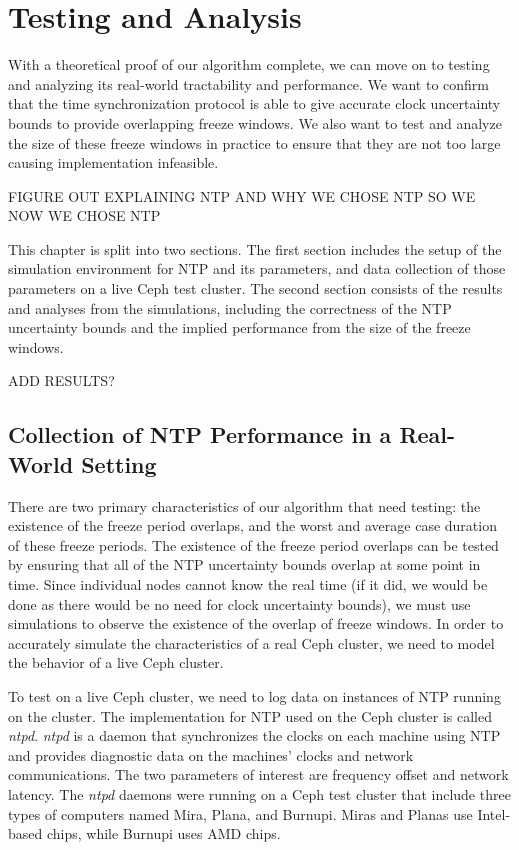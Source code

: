 \chapter{Testing and Analysis}
\label{sec:results}

With a theoretical proof of our algorithm complete, we can move on to
testing and analyzing its real-world tractability and performance. We want to
confirm that the time synchronization protocol is able to give accurate clock
uncertainty bounds to provide overlapping freeze windows. We also
want to test and analyze the size of these freeze windows in practice
to ensure that they are not too large causing implementation infeasible.

FIGURE OUT EXPLAINING NTP AND WHY WE CHOSE NTP SO WE NOW WE CHOSE NTP

This chapter is split into two sections. The first section includes
the setup of the simulation environment for NTP and its parameters,
and data collection of those parameters on a live Ceph test cluster.
The second section consists of the results and analyses from the simulations,
including the correctness of the NTP uncertainty bounds and the implied
performance from the size of the freeze windows.

ADD RESULTS?



\section{Collection of NTP Performance in a Real-World Setting}

There are two primary characteristics of our algorithm that need
testing: the existence of the freeze period overlaps, and the 
worst and average case duration of these freeze periods. 
The existence of the freeze period overlaps can be tested by 
ensuring that all of the NTP uncertainty bounds overlap at some 
point in time. Since individual nodes cannot know the real time
(if it did, we would be done as there would be no need for clock uncertainty
bounds), we must use simulations to observe the existence of 
the overlap of freeze windows. In order to accurately simulate the
characteristics of a real Ceph cluster, we need to model the
behavior of a live Ceph cluster.

To test on a live Ceph cluster, we need to log data on 
instances of NTP running on the cluster. The implementation for NTP 
used on the Ceph cluster is called \textit{ntpd}. \textit{ntpd} is a
daemon that synchronizes the clocks on each machine using NTP and
provides diagnostic data on the machines' clocks and network 
communications. The two parameters of interest are frequency offset and
network latency. The \textit{ntpd} daemons were running on a Ceph
test cluster that include three types of computers named Mira,
Plana, and Burnupi. Miras and Planas use Intel-based chips, while
Burnupi uses AMD chips.

